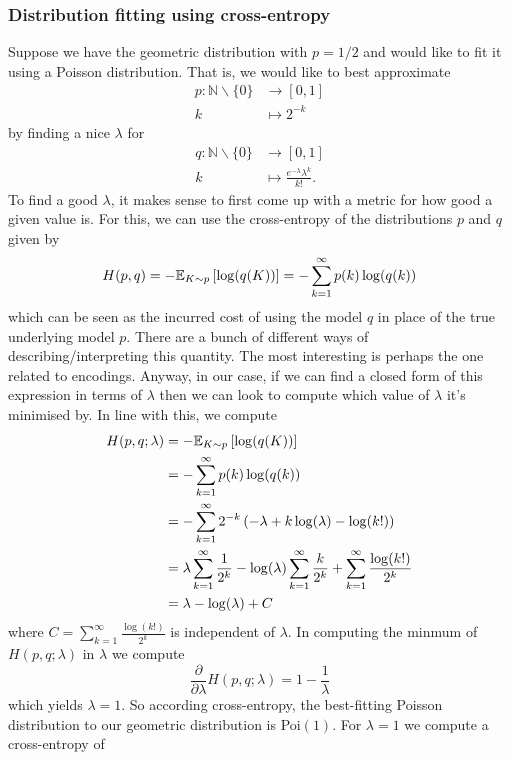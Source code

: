 \documentclass[11pt]{article}
\begin{document}
\begin{appendices}
\subsubsection{Distribution fitting using cross-entropy}
\label{subsubsec:dist_fit_CE}

Suppose we have the geometric distribution with $p=1/2$ and would like to fit it using a Poisson distribution. That is, we would like to best approximate
\begin{align*}
    p:\mathbb{N}\backslash\{0\}&\to[0,1]\\
    k&\mapsto2^{-k}
\end{align*}
by finding a nice $\lambda$ for
\begin{align*}
    q:\mathbb{N}\backslash\{0\}&\to[0,1]\\
    k&\mapsto\frac{e^{-\lambda}\lambda^k}{k!}.
\end{align*}
To find a good $\lambda$, it makes sense to first come up with a metric for how good a given value is. For this, we can use the cross-entropy of the distributions $p$ and $q$ given by
$$
H(p,q)
=
-\mathbb{E}_{K\sim p}\left[\log(q(K))\right]
=
-\sum_{k=1}^{\infty}p(k)\log(q(k))
$$
which can be seen as the incurred cost of using the model $q$ in place of the true underlying model $p$. There are a bunch of different ways of describing/interpreting this quantity. The most interesting is perhaps the one related to encodings. Anyway, in our case, if we can find a closed form of this expression in terms of $\lambda$ then we can look to compute which value of $\lambda$ it's minimised by. In line with this, we compute
\begin{align*}
    H(p,q;\lambda)
    &=
    -\mathbb{E}_{K\sim p}\left[\log(q(K))\right]\\
    &=
    -\sum_{k=1}^{\infty}p(k)\log(q(k))\\
    &=
    -\sum_{k=1}^{\infty}2^{-k}\left(-\lambda+k\log(\lambda)-\log(k!)\right)\\
    &=
    \lambda\sum_{k=1}^{\infty}\frac{1}{2^k}-\log(\lambda)\sum_{k=1}^{\infty}\frac{k}{2^k}+\sum_{k=1}^{\infty}\frac{\log(k!)}{2^k}\\
    &=
    \lambda-\log(\lambda)+C
\end{align*}
where $C=\sum_{k=1}^{\infty}\frac{\log(k!)}{2^k}$ is independent of $\lambda$. In computing the minmum of $H(p,q;\lambda)$ in $\lambda$ we compute
$$
\frac{\partial}{\partial \lambda}H(p,q;\lambda)
=
1-\frac{1}{\lambda}
$$
which yields $\lambda=1$. So according cross-entropy, the best-fitting Poisson distribution to our geometric distribution is Poi$(1)$. For $\lambda=1$ we compute a cross-entropy of

\end{appendices}
\end{document}
